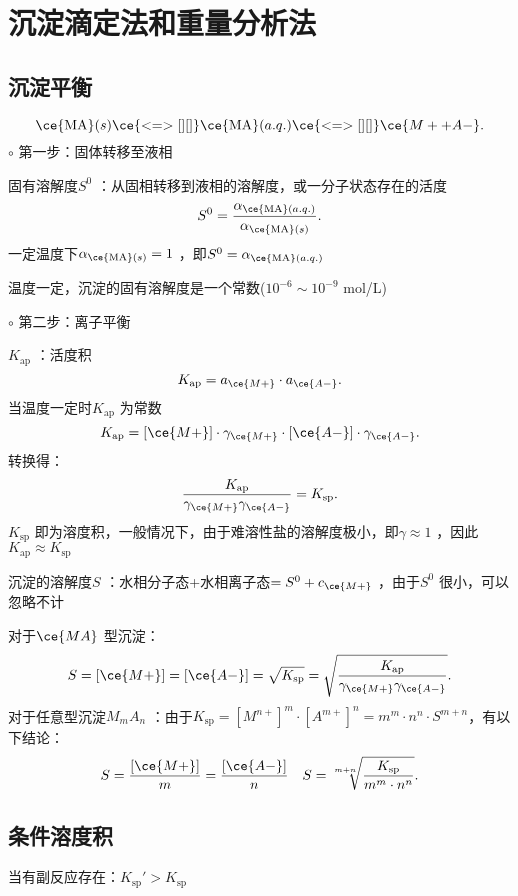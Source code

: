 \section{沉淀滴定法和重量分析法}%
\label{sec:沉淀滴定法和重量分析法}
\subsection{沉淀平衡}%
\label{sub:沉淀平衡}
\[
    \text{\ce{MA}}(s) \ce{<=>[][]}\text{\ce{MA}}(a.q.) \ce{<=>[][]} \ce{M+ +A-}
.\]
$\circ$ 第一步：固体转移至液相
\begin{notation}
    固有溶解度$S^{0}$ ：从固相转移到液相的溶解度，或一分子状态存在的活度\[
        S^{0}=\frac{\alpha_{\text{\ce{MA}}\left( a.q. \right)}}{\alpha_{\text{\ce{MA}}\left( s \right)}}
    .\]
    一定温度下$\alpha_{\text{\ce{MA}}\left( s \right)}=1$ ，即$S^{0}=\alpha_{\text{\ce{MA}}\left( a.q. \right)}$
\end{notation}
\begin{notation}
    温度一定，沉淀的固有溶解度是一个常数($10^{-6}\sim 10^{-9}$ mol/L)
\end{notation}
$\circ$ 第二步：离子平衡
\begin{notation}
    $K_\text{ap}$ ：活度积\[
        K_\text{ap}=a_{\ce{M+}}\cdot a_{\ce{A-}}
    .\]
    当温度一定时$K_\text{ap}$ 为常数\[
        K_\text{ap}=[\ce{M+}]\cdot \gamma_{\ce{M+}}\cdot [\ce{A-}]\cdot \gamma_{\ce{A-}}
    .\]
    转换得：\[
        \frac{K_\text{ap}}{\gamma_{\ce{M+}}\gamma_{\ce{A-}}}=K_\text{sp}
    .\]
    $K_\text{sp}$ 即为溶度积，一般情况下，由于难溶性盐的溶解度极小，即$\gamma\approx 1$ ，因此$K_\text{ap}\approx K_\text{sp}$
\end{notation}
\begin{notation}
    沉淀的溶解度$S$ ：水相分子态+水相离子态$=S^{0}+c_{\ce{M+}}$ ，由于$S^{0}$ 很小，可以忽略不计

    对于$\ce{MA}$ 型沉淀：\[
        S=[\ce{M+}]=[\ce{A-}]=\sqrt{K_\text{sp}}=\sqrt{\frac{K_\text{ap}}{\gamma_{\ce{M+}}\gamma_{\ce{A-}}}} 
    .\]
    对于任意型沉淀$M_mA_n$ ：由于$K_\text{sp}=[M^{n+}]^{m}\cdot [A^{m+}]^{n}=m^{m}\cdot n^{n}\cdot S^{m+n}$，有以下结论：\[
        S=\frac{[\ce{M+}]}{m}=\frac{[\ce{A-}]}{n}\quad S=\sqrt[m+n]{\frac{K_\text{sp}}{m^{m}\cdot n^{n}}}
    .\]
\end{notation}
\subsection{条件溶度积}%
\label{sub:条件溶度积}
当有副反应存在：$K_\text{sp}'>K_\text{sp}$

